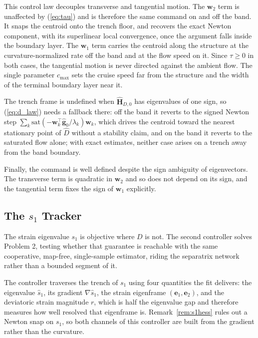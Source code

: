 \documentclass[lettersize,journal]{IEEEtran}
\begin{document}
This control law decouples transverse and tangential motion. The
$\mathbf{w}_2$ term is unaffected by (\ref{eq:tau}) and is therefore the
same command on and off the band. It snaps the centroid onto the trench
floor, and recovers the exact Newton component, with its superlinear
local convergence, once the argument falls inside the boundary layer.
The $\mathbf{w}_1$ term carries the centroid along the structure at the
curvature-normalized rate off the band and at the flow speed on it.
Since $\tau \geq 0$ in both cases, the tangential motion is never
directed against the ambient flow. The single parameter $c_{\max}$ sets
the cruise speed far from the structure and the width of the terminal
boundary layer near it.

The trench frame is undefined when $\hat{\mathbf{H}}_{D,0}$ has
eigenvalues of one sign, so (\ref{eq:d_law}) needs a fallback there:
off the band it reverts to the signed Newton step $\sum_k
\mathrm{sat}(-\mathbf{w}_k^\top\hat{\mathbf{g}}_0/\lambda_k)\mathbf{w}_k$,
which drives the centroid toward the nearest stationary point of
$\hat{D}$ without a stability claim, and on the band it reverts to the
saturated flow alone; with exact estimates, neither case arises on a
trench away from the band boundary.

Finally, the command is well defined despite the sign ambiguity of
eigenvectors. The transverse term is quadratic in $\mathbf{w}_2$ and so
does not depend on its sign, and the tangential term fixes the sign of
$\mathbf{w}_1$ explicitly.


\subsection{The $s_1$ Tracker}
\label{sec:oecs_controller}

The strain eigenvalue $s_1$ is objective where $D$ is not. The second
controller solves Problem 2, testing whether that guarantee is
reachable with the same cooperative, map-free, single-sample estimator,
riding the separatrix network rather than a bounded segment of it.

The controller traverses the trench of $s_1$ using four quantities the
fit delivers: the eigenvalue $\hat{s}_1$, its gradient
$\nabla\hat{s}_1$, the strain eigenframe $(\mathbf{e}_1, \mathbf{e}_2)$,
and the deviatoric strain magnitude $r$, which is half the eigenvalue gap
and therefore measures how well resolved that eigenframe is.
Remark~\ref{rem:s1hess} rules out a Newton snap on $s_1$, so both
channels of this controller are built from the gradient rather than the
curvature.
\end{document}
